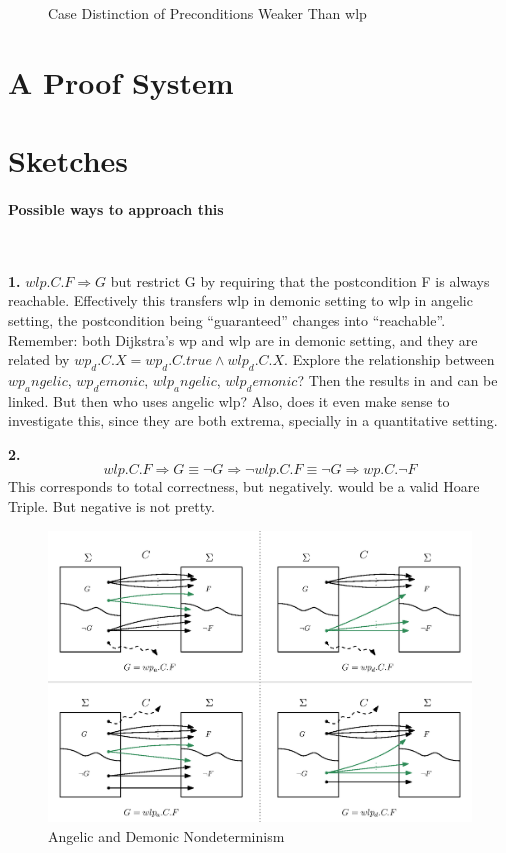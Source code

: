 \begin{figure}[ht!]
\caption{Case Distinction of Preconditions Weaker Than wlp }
\label{fig:wlp-g}
\end{figure}



\section{A Proof System}


\section{Sketches} 

\paragraph{Possible ways to approach this}\ 

\textbf{1.} $wlp.C.F \Longrightarrow G $ but restrict G by requiring that the postcondition F is always reachable. 
Effectively this transfers wlp in demonic setting to wlp in angelic setting, the postcondition being ``guaranteed'' changes into ``reachable''. 
Remember: both Dijkstra's wp and wlp are in demonic setting, and they are related by $wp_d.C.X = wp_d.C.true \wedge wlp_d.C.X$. 
Explore the relationship between $wp_angelic$, $wp_demonic$, $wlp_angelic$, $wlp_demonic$? 
Then the results in \cite{zhang22} and \cite{dijkstra90} can be linked. 
But then who uses angelic wlp? 
Also, does it even make sense to investigate this, since they are both extrema, specially in a quantitative setting. 

\textbf{2.}$$wlp.C.F \Longrightarrow G \equiv \neg G \Longrightarrow \neg wlp.C.F \equiv \neg G \Longrightarrow  wp.C.\neg F $$ 
This corresponds to total correctness, but negatively. 
 would be a valid Hoare Triple. 
But negative is not pretty. 

\begin{figure}[ht!]\centering
\includegraphics[width=\textwidth]{image/wp-wlp-angelic-demonic.eps}
\caption{Angelic and Demonic Nondeterminism}
\label{fig:ang-dem}
\end{figure}


